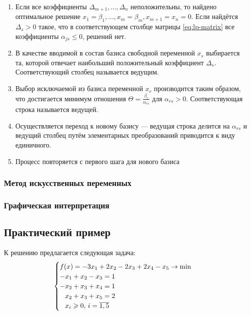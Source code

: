   \begin{enumerate}
    \renewcommand{\labelenumi}{\textbf{Шаг \arabic{enumi}.}}
  \item Если все коэффициенты $\Delta_{m+1}, \dotsc, \Delta_n$
    неположительны, то найдено оптимальное решение $x_1 = \beta_1,
    \dotsc, x_m = \beta_m, x_{m+1} = x_n = 0$. Если найдётся $\Delta_s
    > 0$ такое, что в соответствующем столбце матрицы
    \eqref{eq:lp-matrix} все коэффициенты $\alpha_{js} \leq 0$,
    решений нет.
  \item В качестве вводимой в состав базиса свободной переменной $x_s$
    выбирается та, которой отвечает наибольший положительный
    коэффициент $\Delta_s$. Соответствующий столбец называется
    ведущим.
  \item Выбор исключаемой из базиса переменной $x_r$ производится
    таким образом, что достигается минимум отношения $\Theta =
    \frac{\beta_r}{\alpha_{rs}}$ для $\alpha_{rs} > 0$.
    Соответствующая строка называется ведущей.
  \item Осуществляется переход к новому базису — ведущая строка
    делится на $\alpha_{rs}$ и ведущий столбец путём элементарных
    преобразований приводится к виду единичного.
  \item Процесс повторяется с первого шага для нового базиса
  \end{enumerate}

\subsubsection{Метод искусственных переменных}

\subsubsection{Графическая интерпретация}

\subsection{Практический пример}

К решению предлагается следующая задача:
\begin{equation}
  \label{eq:lp-initial}
  \begin{cases}
    f(x) = -3x_1+2x_2-2x_3+2x_4-x_5 \to \min \\
    -x_1+x_2-x_3=1 \\
    -x_2+x_3+x_4=1 \\
    \phm x_2+x_3+x_5=2 \\
    \phm x_i \geq 0,\, i = \overline{1, 5}
  \end{cases}
\end{equation}

